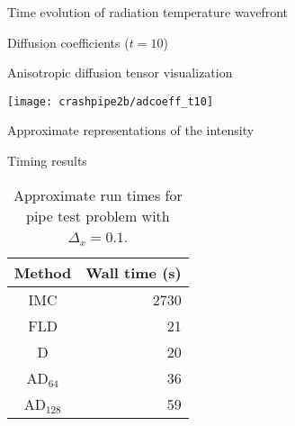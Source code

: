 \documentclass{beamer}
\begin{document}
\begin{frame}{Time evolution of radiation temperature wavefront}

  \centering%
  \par
\end{frame}
\begin{frame}{Diffusion coefficients ($t=10$)}
  
  \centering\small%
  \par
\end{frame}
\begin{frame}{Anisotropic diffusion tensor visualization}
  
  \centering%
  \texttt{[image: crashpipe2b/adcoeff\_t10]}%
  \par
\end{frame}
\begin{frame}{Approximate representations of the intensity}
  
  \centering\small%
  \par
\end{frame}
\begin{frame}{Timing results}
  \begin{table}[htb]
    \centering
    \begin{tabular}{cr}
      Method & Wall time (s) \\ \hline
      IMC & 2730 \\
      FLD & 21 \\
      D   & 20 \\
      AD$_{64}$ & 36 \\
      AD$_{128}$ & 59
    \end{tabular}
    \caption{Approximate run times for pipe test problem with $\Delta_x=0.1$.}
    \label{tab:pipeTiming}
  \end{table}
\end{frame}

\end{document}
